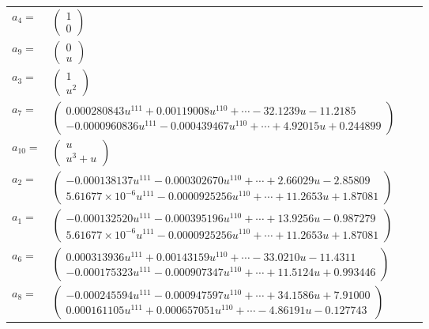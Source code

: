 \documentclass[1p]{elsarticle_modified}
\theoremstyle{definition}
\begin{document}
\begin{tabular}{m{7pt} m{180pt} m{7pt} m{180pt} }
\flushright $a_{4}=$&$\begin{pmatrix}1\\0\end{pmatrix}$ \\
\flushright $a_{9}=$&$\begin{pmatrix}0\\u\end{pmatrix}$ \\
\flushright $a_{3}=$&$\begin{pmatrix}1\\u^2\end{pmatrix}$ \\
\flushright $a_{7}=$&$\begin{pmatrix}0.000280843 u^{111}+0.00119008 u^{110}+\cdots-32.1239 u-11.2185\\-0.0000960836 u^{111}-0.000439467 u^{110}+\cdots+4.92015 u+0.244899\end{pmatrix}$ \\
\flushright $a_{10}=$&$\begin{pmatrix}u\\u^3+u\end{pmatrix}$ \\
\flushright $a_{2}=$&$\begin{pmatrix}-0.000138137 u^{111}-0.000302670 u^{110}+\cdots+2.66029 u-2.85809\\5.61677\times10^{-6} u^{111}-0.0000925256 u^{110}+\cdots+11.2653 u+1.87081\end{pmatrix}$ \\
\flushright $a_{1}=$&$\begin{pmatrix}-0.000132520 u^{111}-0.000395196 u^{110}+\cdots+13.9256 u-0.987279\\5.61677\times10^{-6} u^{111}-0.0000925256 u^{110}+\cdots+11.2653 u+1.87081\end{pmatrix}$ \\
\flushright $a_{6}=$&$\begin{pmatrix}0.000313936 u^{111}+0.00143159 u^{110}+\cdots-33.0210 u-11.4311\\-0.000175323 u^{111}-0.000907347 u^{110}+\cdots+11.5124 u+0.993446\end{pmatrix}$ \\
\flushright $a_{8}=$&$\begin{pmatrix}-0.000245594 u^{111}-0.000947597 u^{110}+\cdots+34.1586 u+7.91000\\0.000161105 u^{111}+0.000657051 u^{110}+\cdots-4.86191 u-0.127743\end{pmatrix}$ \\

\end{tabular}
\end{document}
